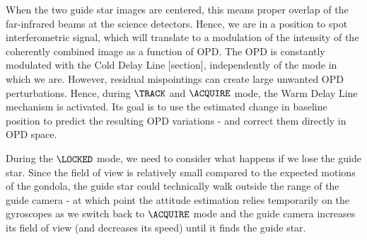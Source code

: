 When the two guide star images are centered, this means proper overlap of the far-infrared beams at the science detectors. Hence, we are in a position to spot interferometric signal, which will translate to a modulation of the intensity of the coherently combined image as a function of OPD. The OPD is constantly modulated with the Cold Delay Line [section], independently of the mode in which we are. However, residual mispointings can create large unwanted OPD perturbations. Hence, during $\TRACK$ and $\ACQUIRE$ mode, the Warm Delay Line mechanism is activated. Its goal is to use the estimated change in baseline position to predict the resulting OPD variations - and correct them directly in OPD space. 

During the $\LOCKED$ mode, we need to consider what happens if we lose the guide star. Since the field of view is relatively small compared to the expected motions of the gondola, the guide star could technically walk outside the range of the guide camera - at which point the attitude estimation relies temporarily on the gyroscopes as we switch back to $\ACQUIRE$ mode and the guide camera increases its field of view (and decreases its speed) until it finds the guide star.


